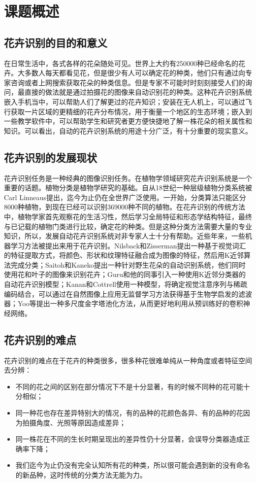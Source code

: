 \documentclass[supercite]{HustGraduPaper}
\begin{document}
\begin{sloppypar}
	\clearpage%
	
	\section{课题概述}
  \subsection{花卉识别的目的和意义}
  在日常生活中，各式各样的花朵随处可见。世界上大约有250000种已经命名的花卉。大多数人每天都看见花，但是很少有人可以确定花的种类，他们只有通过向专家咨询或者上网搜索获取花朵的种类信息。但是专家不可能时时刻刻接受人们的询问，最直接的做法就是通过拍摄花的图像来自动识别花的种类\cite{6968612}。这种花卉识别系统嵌入手机当中，可以帮助人们了解更过的花卉知识；安装在无人机上，可以通过飞行获取一片区域的更精细的花卉分布情况，用于衡量一个地区的生态环境；嵌入到一些教学软件中，可以帮助学生和研究者更方便快捷地了解一株花朵的相关属性和知识。可以看出，自动的花卉识别系统的用途十分广泛，有十分重要的现实意义。
  \subsection{花卉识别的发展现状}
  花卉识别任务是一种经典的图像识别任务。在植物学领域研究花卉识别系统是一个重要的话题。植物分类是植物学研究的基础。自从18世纪一种层级植物分类系统被Carl Linneaus提出，迄今为止仍在全世界广泛使用。一开始，分类算法只能区分8000种植物，到现在已经可以识别369000种不同的植物。在花卉识别的传统方法中，植物学家首先观察花的生活习性，然后学习全局特征和形态学结构特征，最终与已记载的植物门类进行比较，确定花的种类。但是这种分类方法需要大量的专业知识，所以，发展自动花卉识别系统对非专家人士十分有帮助\cite{7818296}。近些年来，一些机器学习方法被提出来用于花卉识别。Nilsback和Zisserman\cite{1640927}提出一种基于视觉词汇的特征提取方式，将颜色、形状和纹理特征融合成为图像的特征，然后用K近邻算法完成分类；Saitoh和Kaneko\cite{new1}提出一种针对野生花朵的自动识别系统，他们同时使用花和叶子的图像来识别花卉；Guru和他的同事\cite{4756141}引入一种使用K近邻分类器的自动花卉识别模型；Kanan和Cottrell\cite{5539947}使用一种模型，将确定视觉注意序列与稀疏编码结合，可以通过在自然图像上应用无监督学习方法获得基于生物学启发的滤波器；Yoo等\cite{7301274}提出一种多尺度金字塔池化方法，从而更好地利用从预训练好的卷积神经网络。
  \subsection{花卉识别的难点}
  花卉识别的难点在于花卉的种类很多，很多种花很难单纯从一种角度或者特征空间去分辨：\begin{itemize}
     \item 不同的花之间的区别在部分情况下不是十分显著，有的时候不同种的花可能十分相似；
     \item 同一种花也存在差异特别大的情况，有的品种的花颜色各异、有的品种的花因为拍摄角度、光照等原因造成差异；
     \item 同一株花在不同的生长时期呈现出的差异性仍十分显著，会误导分类器造成正确率下降；
     \item 我们迄今为止仍没有完全认知所有花的种类，所以很可能会遇到新的没有命名的新品种，这时传统的分类方法无能为力。
  \end{itemize}

\end{sloppypar}
\end{document}
